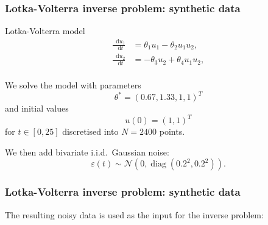 \documentclass{beamer}
\newcommand*\diff{\mathop{}\!\mathrm{d}}
\DeclareMathOperator{\diag}{diag}
\begin{document}
\begin{frame}
\frametitle{Lotka-Volterra inverse problem: synthetic data}

\begin{block}{Lotka-Volterra model}
\begin{equation*}
\begin{aligned}
\frac{\diff u_1}{\diff t} & = \theta_1 u_1 - \theta_2 u_1 u_2, \\
\frac{\diff u_2}{\diff t} & = -\theta_3 u_2 + \theta_4 u_1 u_2, \\
\end{aligned}
\end{equation*}
\end{block}

We solve the model with parameters
\begin{equation*}
\theta^* = (0.67, 1.33, 1, 1)^T
\end{equation*}
and initial values
\begin{equation*}
u(0) = (1, 1)^T
\end{equation*}
for $t \in [0, 25]$ discretised into $N = 2400$ points.

We then add bivariate i.i.d.\ Gaussian noise:
\begin{equation*}
\varepsilon(t) \sim \mathcal{N}(0, \diag(0.2^2, 0.2^2)).
\end{equation*}

\end{frame}

\begin{frame}
\frametitle{Lotka-Volterra inverse problem: synthetic data}

The resulting noisy data is used as the input for the inverse problem:

\begin{figure}[h]
\centering
{}
\end{figure}

\end{frame}
\end{document}
